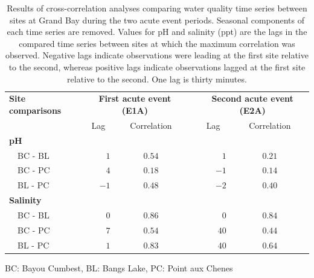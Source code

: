 \documentclass[letterpaper,12pt]{article}\usepackage[]{graphicx}\usepackage[]{color}
\begin{document}
\begin{table}[!tbp]
\caption{Results of cross-correlation analyses comparing water quality time series between sites at Grand Bay during the two acute event periods.  Seasonal components of each time series are removed.  Values for pH and salinity (ppt) are the lags in the compared time series between sites at which the maximum correlation was observed.  Negative lags indicate observations were leading at the first site relative to the second, whereas positive lags indicate observations lagged at the first site relative to the second.  One lag is thirty minutes.\label{tab:ccfwq}} 
\begin{center}
\begin{tabular}{lrccrc}
\hline\hline
\multicolumn{1}{l}{\bfseries Site comparisons}&\multicolumn{2}{c}{\bfseries First acute event (E1A)}&\multicolumn{1}{c}{\bfseries }&\multicolumn{2}{c}{\bfseries Second acute event (E2A)}\tabularnewline
\cline{2-3} \cline{5-6}
\multicolumn{1}{l}{}&\multicolumn{1}{c}{Lag}&\multicolumn{1}{c}{Correlation}&\multicolumn{1}{c}{}&\multicolumn{1}{c}{Lag}&\multicolumn{1}{c}{Correlation}\tabularnewline
\hline
{\bfseries pH}&&&&&\tabularnewline
~~BC - BL&$ 1$&$0.54$&&$ 1$&$0.21$\tabularnewline
~~BC - PC&$ 4$&$0.18$&&$-1$&$0.14$\tabularnewline
~~BL - PC&$-1$&$0.48$&&$-2$&$0.40$\tabularnewline
\hline
{\bfseries Salinity}&&&&&\tabularnewline
~~BC - BL&$ 0$&$0.86$&&$ 0$&$0.84$\tabularnewline
~~BC - PC&$ 7$&$0.54$&&$40$&$0.44$\tabularnewline
~~BL - PC&$ 1$&$0.83$&&$40$&$0.64$\tabularnewline
\hline
\end{tabular}\end{center}

\footnotesize BC: Bayou Cumbest, BL: Bangs Lake, PC: Point aux Chenes\end{table}

\clearpage
\end{document}
